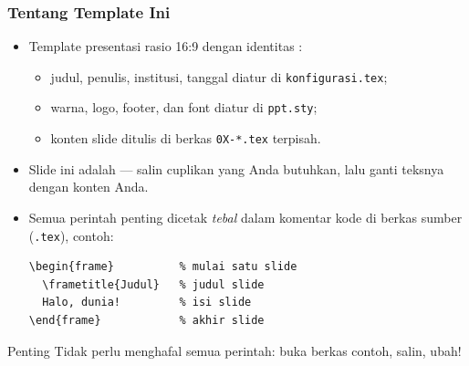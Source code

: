 \begin{frame}[fragile]
  \frametitle{Tentang Template Ini}

  \begin{itemize}
    \item Template presentasi  rasio 16:9 dengan
          identitas :
          \begin{itemize}
            \item judul, penulis, institusi, tanggal diatur di \texttt{konfigurasi.tex};
            \item warna, logo, footer, dan font diatur di \texttt{ppt.sty};
            \item konten slide ditulis di berkas \texttt{0X-*.tex} terpisah.
          \end{itemize}
    \item Slide ini adalah  --- salin cuplikan yang
          Anda butuhkan, lalu ganti teksnya dengan konten Anda.
    \item Semua perintah penting dicetak \emph{tebal} dalam komentar kode
          di berkas sumber (\texttt{.tex}), contoh:

          \begin{lstlisting}
\begin{frame}          % mulai satu slide
  \frametitle{Judul}   % judul slide
  Halo, dunia!         % isi slide
\end{frame}            % akhir slide
          \end{lstlisting}
  \end{itemize}

  \begin{alertblock}{Penting}
    Tidak perlu menghafal semua perintah: buka berkas contoh, salin, ubah!
  \end{alertblock}
\end{frame}

